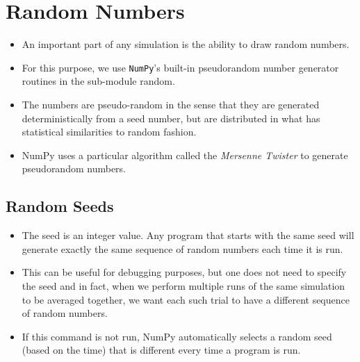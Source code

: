 \documentclass[numpymain.tex]{subfiles}
\begin{document}
\section{Random Numbers}



\begin{itemize}
\item An important part of any simulation is the ability to draw random numbers. 
\item For this purpose, 
we use \texttt{NumPy}'s built-in pseudorandom number generator routines in the sub-module 
random. 
\item The numbers are pseudo-random in the sense that they are generated 
deterministically from a seed number, but are distributed in what has statistical similarities to 
random fashion. 
\item NumPy uses a particular algorithm called the \textit{Mersenne Twister} to generate 
pseudorandom numbers. 
\end{itemize}

\subsection{Random Seeds}
\begin{itemize}
\item The seed is an integer value. Any program that starts with the same seed will generate exactly 
the same sequence of random numbers each time it is run. 
\item This can be useful for debugging 
purposes, but one does not need to specify the seed and in fact, when we perform multiple 
runs of the same simulation to be averaged together, we want each such trial to have a 
different sequence of random numbers. 
\item If this command is not run, NumPy automatically 
selects a random seed (based on the time) that is different every time a program is run. 
\end{itemize}
\end{document}
